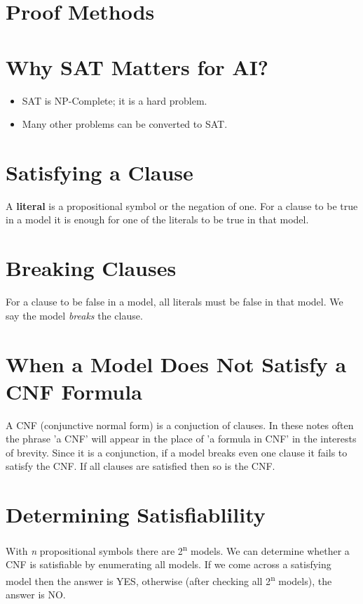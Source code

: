 \documentclass[11pt]{article}
\begin{document}
\section{Proof Methods}
\label{sec:org12fc565}

\maketitle
\tableofcontents


\section{Why SAT Matters for AI?}
\label{sec:org796256c}
\begin{itemize}
\item SAT is NP-Complete; it is a hard problem.
\item Many other problems can be converted to SAT.
\end{itemize}

\section{Satisfying a Clause}
\label{sec:org0691404}
A \textbf{literal} is a propositional symbol or the negation of one.
For a clause to be true in a model it is enough for one of the literals to be true in that model.

\section{Breaking Clauses}
\label{sec:org30da39f}
For a clause to be false in a model, all literals must be false in that model.
We say the model \emph{breaks} the clause.

\section{When a Model Does Not Satisfy a CNF Formula}
\label{sec:org207bb29}
A CNF (conjunctive normal form) is a conjuction of clauses.
In these notes often the phrase 'a CNF' will appear in the place of 'a formula in CNF' in the interests of brevity.
Since it is a conjunction, if a model breaks even one clause it fails to satisfy the CNF.
If all clauses are satisfied then so is the CNF.

\section{Determining Satisfiablility}
\label{sec:orgc4e5938}
With \emph{n} propositional symbols there are 2\textsuperscript{n} models.
We can determine whether a CNF is satisfiable by enumerating all models.
If we come across a satisfying model then the answer is YES, otherwise (after checking all 2\textsuperscript{n} models), the answer is NO.
\end{document}
